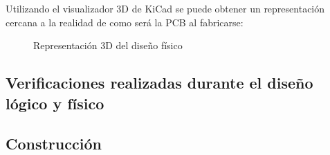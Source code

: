 Utilizando el visualizador 3D de KiCad se puede obtener un representación cercana a la realidad de como será la PCB al fabricarse:

\begin{figure}[htbp]
    \centering
    \caption{Representación 3D del diseño físico} \label{fig:lego}
    \end{figure}
\subsection{Verificaciones realizadas durante el diseño lógico y físico }

\subsection{Construcción}

